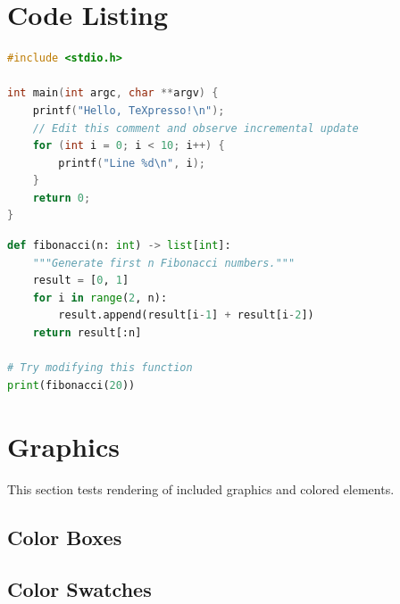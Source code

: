 \documentclass[12pt,a4paper]{article}
\begin{document}
\section{Code Listing}
\label{sec:code}

\lstset{
  basicstyle=\ttfamily\small,
  numbers=left,
  numberstyle=\tiny,
  frame=single,
  breaklines=true,
}

\begin{lstlisting}[language=C, caption={C code example}, label={lst:c}]
#include <stdio.h>

int main(int argc, char **argv) {
    printf("Hello, TeXpresso!\n");
    // Edit this comment and observe incremental update
    for (int i = 0; i < 10; i++) {
        printf("Line %d\n", i);
    }
    return 0;
}
\end{lstlisting}

\begin{lstlisting}[language=Python, caption={Python example}, label={lst:python}]
def fibonacci(n: int) -> list[int]:
    """Generate first n Fibonacci numbers."""
    result = [0, 1]
    for i in range(2, n):
        result.append(result[i-1] + result[i-2])
    return result[:n]

# Try modifying this function
print(fibonacci(20))
\end{lstlisting}

\section{Graphics}
\label{sec:graphics}

This section tests rendering of included graphics and colored elements.

\subsection{Color Boxes}

 \hspace{1em}
 \hspace{1em}

\subsection{Color Swatches}
\end{document}
